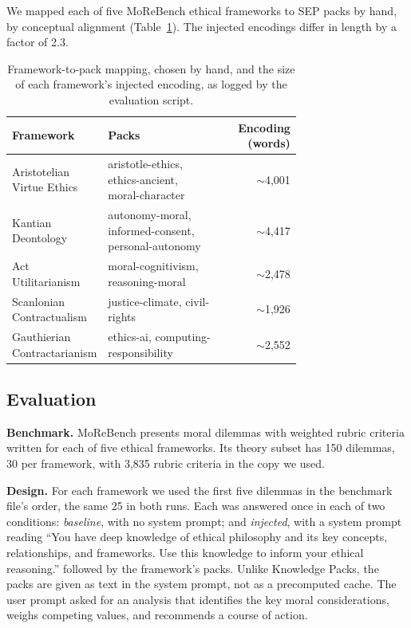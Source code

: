 \documentclass[11pt,a4paper]{article}
\begin{document}
We mapped each of five MoReBench ethical frameworks to SEP packs by hand, by conceptual alignment (Table~\ref{tab:mapping}). The injected encodings differ in length by a factor of 2.3.

\begin{table}[h]
\centering
\small
\begin{tabular}{p{0.32\linewidth}p{0.40\linewidth}r}
\toprule
\textbf{Framework} & \textbf{Packs} & \textbf{Encoding (words)} \\
\midrule
Aristotelian Virtue Ethics & aristotle-ethics, ethics-ancient, moral-character & $\sim$4,001 \\
Kantian Deontology & autonomy-moral, informed-consent, personal-autonomy & $\sim$4,417 \\
Act Utilitarianism & moral-cognitivism, reasoning-moral & $\sim$2,478 \\
Scanlonian Contractualism & justice-climate, civil-rights & $\sim$1,926 \\
Gauthierian Contractarianism & ethics-ai, computing-responsibility & $\sim$2,552 \\
\bottomrule
\end{tabular}
\caption{Framework-to-pack mapping, chosen by hand, and the size of each framework's injected encoding, as logged by the evaluation script.}
\label{tab:mapping}
\end{table}

\subsection{Evaluation}

\textbf{Benchmark.} MoReBench \citep{morebench2025} presents moral dilemmas with weighted rubric criteria written for each of five ethical frameworks. Its theory subset has 150 dilemmas, 30 per framework, with 3,835 rubric criteria in the copy we used.

\textbf{Design.} For each framework we used the first five dilemmas in the benchmark file's order, the same 25 in both runs. Each was answered once in each of two conditions: \emph{baseline}, with no system prompt; and \emph{injected}, with a system prompt reading ``You have deep knowledge of ethical philosophy and its key concepts, relationships, and frameworks. Use this knowledge to inform your ethical reasoning.'' followed by the framework's packs. Unlike Knowledge Packs, the packs are given as text in the system prompt, not as a precomputed cache. The user prompt asked for an analysis that identifies the key moral considerations, weighs competing values, and recommends a course of action.
\end{document}
